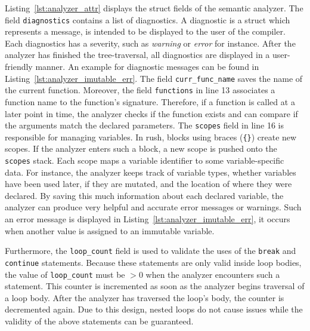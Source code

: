 Listing~\ref{lst:analyzer_attr} displays the struct fields of the semantic analyzer.
The field \texttt{diagnostics} contains a list of diagnostics.
A diagnostic is a struct which represents a message, is intended to be displayed to the user of the compiler.
Each diagnostics has a severity, such as \emph{warning} or \emph{error} for instance.
After the analyzer has finished the tree-traversal, all diagnostics are displayed in a user-friendly manner.
An example for diagnostic messages can be found in Listing~\ref{lst:analyzer_imutable_err}.
The field \texttt{curr\_func\_name} saves the name of the current function.
Moreover, the field \texttt{functions} in line 13 associates a function name to the function's signature.
Therefore, if a function is called at a later point in time, the analyzer checks if the function exists and can compare if the arguments match the declared parameters.
The \texttt{scopes} field in line 16 is responsible for managing variables.
In rush, blocks using braces (\texttt{\{\}}) create new scopes.
If the analyzer enters such a block, a new scope is pushed onto the \texttt{scopes} stack.
Each scope maps a variable identifier to some variable-specific data.
For instance, the analyzer keeps track of variable types, whether variables have been used later, if they are mutated, and the location of where they were declared.
By saving this much information about each declared variable, the analyzer can produce very helpful and accurate error messages or warnings.
Such an error message is displayed in Listing~\ref{lst:analyzer_imutable_err}, it occurs when another value is assigned to an immutable variable.


Furthermore, the \texttt{loop\_count} field is used to validate the uses of the \texttt{break} and \texttt{continue} statements.
Because these statements are only valid inside loop bodies, the value of \texttt{loop\_count} must be $> 0$ when the analyzer encounters such a statement.
This counter is incremented as soon as the analyzer begins traversal of a loop body.
After the analyzer has traversed the loop's body, the counter is decremented again.
Due to this design, nested loops do not cause issues while the validity of the above statements can be guaranteed.

